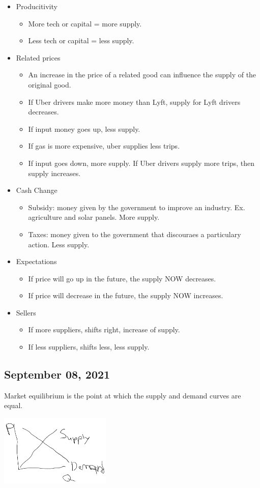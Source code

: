 \documentclass{scrreprt} %
\begin{document}
\begin{itemize}
	\item Producitivity
	\begin{itemize}
		\item More tech or capital = more supply.
		\item Less tech or capital = less supply.
	\end{itemize}
	\item Related prices
	\begin{itemize}
		\item An increase in the price of a related good can influence the 
		supply of the original good.
		\item If Uber drivers make more money than Lyft, supply for Lyft drivers
		decreases.
		\item If input money goes up, less supply.
		\item If gas is more expensive, uber supplies less trips.
		\item If input goes down, more supply. If Uber drivers supply more trips,
		then supply increases.
	\end{itemize}
	\item Cash Change
	\begin{itemize}
		\item Subsidy: money given by the government to improve an industry. Ex.
		agriculture and solar panels. More supply.
		\item Taxes: money given to the government that discouraes a particulary action.
		Less supply.
	\end{itemize}

	\item Expectations
	\begin{itemize}
		\item If price will go up in the future, the supply NOW decreases.
		\item If price will decrease in the future, the supply NOW increases.
	\end{itemize}
	\item Sellers
	\begin{itemize}
		\item If more suppliers, shifts right, increase of supply.
		\item If less suppliers, shifts less, less supply.	
	\end{itemize}

\end{itemize}

\subsection{September 08, 2021}
\begin{definition}
	Market equilibrium is the point at which the supply and demand curves are equal.
	
	\includegraphics[width=200px]{2021-09-08-12-56-11.png}
\end{definition}
\end{document}
